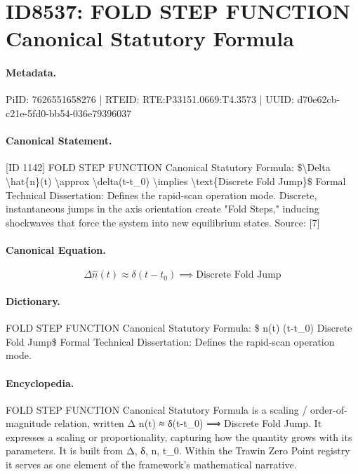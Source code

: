 \section*{ID8537: FOLD STEP FUNCTION Canonical Statutory Formula}
\paragraph{Metadata.}
PiID: 7626551658276 | RTEID: RTE:P33151.0669:T4.3573 | UUID: d70e62cb-c21e-5fd0-bb54-036e79396037

\paragraph{Canonical Statement.}
[ID 1142] FOLD STEP FUNCTION Canonical Statutory Formula: \$\textbackslash{}Delta \textbackslash{}hat\{n\}(t) \textbackslash{}approx \textbackslash{}delta(t-t\_0) \textbackslash{}implies \textbackslash{}text\{Discrete Fold Jump\}\$ Formal Technical Dissertation: Defines the rapid-scan operation mode. Discrete, instantaneous jumps in the axis orientation create "Fold Steps," inducing shockwaves that force the system into new equilibrium states. Source: [7]

\paragraph{Canonical Equation.}
\[
\Delta \hat{n}(t) \approx \delta(t-t_0) \implies \text{Discrete Fold Jump}
\]

\paragraph{Dictionary.}
FOLD STEP FUNCTION Canonical Statutory Formula: \$ n(t) (t-t\_0) Discrete Fold Jump\$ Formal Technical Dissertation: Defines the rapid-scan operation mode.

\paragraph{Encyclopedia.}
FOLD STEP FUNCTION Canonical Statutory Formula is a scaling / order-of-magnitude relation, written Δ n(t) ≈ δ(t-t\_0) ⟹ Discrete Fold Jump. It expresses a scaling or proportionality, capturing how the quantity grows with its parameters. It is built from Δ, δ, n, t\_0. Within the Trawin Zero Point registry it serves as one element of the framework's mathematical narrative.

